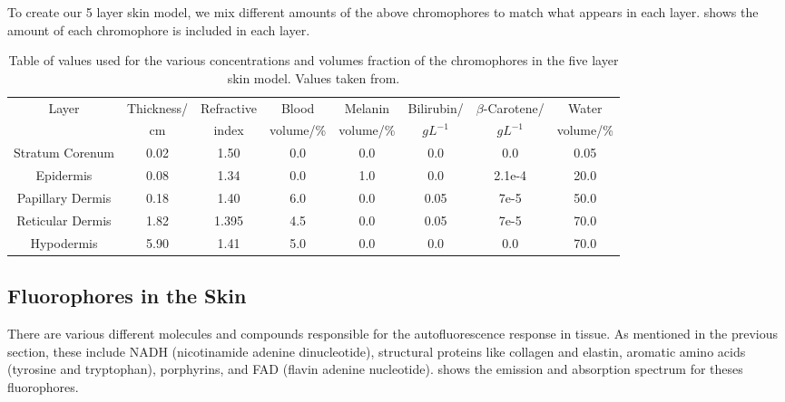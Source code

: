 To create our 5 layer skin model, we mix different amounts of the above chromophores to match what appears in each layer.
 shows the amount of each chromophore is included in each layer.


\begin{table}[tb] 
    \begin{adjustwidth}{-.5in}{-.5in}  

  \begin{center}
  \begin{tabular}{|c|c|c|c|c|c|c|c|}
  \hline
  Layer & Thickness/ & Refractive & Blood & Melanin & Bilirubin/ & $\beta$-Carotene/ & Water\\
    &cm & index & volume/\% & volume/\% & $gL^{-1}$ & $gL^{-1}$ & volume/\%\\
  \hline
  Stratum Corenum  & 0.02 & 1.50  & 0.0 & 0.0 & 0.0  & 0.0 & 0.05\\
  Epidermis        & 0.08 & 1.34  & 0.0 & 1.0 & 0.0  & 2.1e-4 & 20.0\\
  Papillary Dermis & 0.18 & 1.40  & 6.0 & 0.0 & 0.05 & 7e-5 & 50.0\\
  Reticular Dermis & 1.82 & 1.395 & 4.5 & 0.0 & 0.05 & 7e-5 & 70.0\\
  Hypodermis       & 5.90 & 1.41  & 5.0 & 0.0 & 0.0  & 0.0 & 70.0\\

  \hline
  \end{tabular}
    \caption{Table of values used for the various concentrations and volumes fraction of the chromophores in the five layer skin model. Values taken from\cite{krishnaswamy2004biophysically,meglinski2002quantitative,campbell20153d,iglesias2015biophysically}.}
  \label{tab:optpropsvals}
  \end{center}
      \end{adjustwidth}

\end{table}

\subsection*{Fluorophores in the Skin}

There are various different molecules and compounds responsible for the autofluorescence response in tissue.
As mentioned in the previous section, these include NADH (nicotinamide adenine dinucleotide), structural proteins like collagen and elastin, aromatic amino acids (tyrosine and tryptophan), porphyrins, and FAD (flavin adenine nucleotide).
 shows the emission and absorption spectrum for theses fluorophores.


